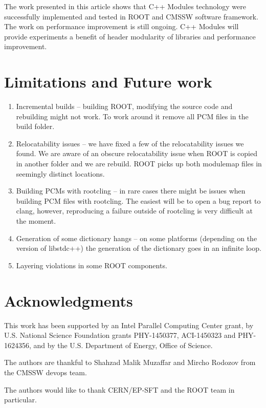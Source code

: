 \documentclass[12pt]{iopart}
\begin{document}
 The work presented in this article shows that C++ Modules technology were successfully implemented and tested in ROOT and CMSSW software framework. The work on performance improvement is still ongoing. C++ Modules will provide experiments a benefit of header modularity of libraries and performance improvement.

\section{Limitations and Future work}
\begin{enumerate}
    \item Incremental builds -- building ROOT, modifying the source code and rebuilding might not work. To work around it remove all PCM files in the build folder.
    \item Relocatability issues -- we have fixed a few of the relocatability issues we found. We are aware of an obscure relocatability issue when ROOT is copied in another folder and we are rebuild. ROOT picks up both modulemap files in seemingly distinct locations.
    \item Building PCMs with rootcling -- in rare cases there might be issues when building PCM files with rootcling. The easiest will be to open a bug report to clang, however, reproducing a failure outside of rootcling is very difficult at the moment.
    \item Generation of some dictionary hangs -- on some platforms (depending on the version of libstdc++) the generation of the dictionary goes in an infinite loop. 
    \item Layering violations in some ROOT components.
\end{enumerate}


\section{Acknowledgments}
\label{ack}

This work has been supported by an Intel Parallel Computing Center grant, by U.S. National Science Foundation grants PHY-1450377, ACI-1450323 and PHY-1624356, and by the U.S. Department of Energy, Office of Science.

The authors are thankful to Shahzad Malik Muzaffar and Mircho Rodozov from the CMSSW devops team.

The authors would like to thank CERN/EP-SFT and the ROOT team in particular.
\end{document}
